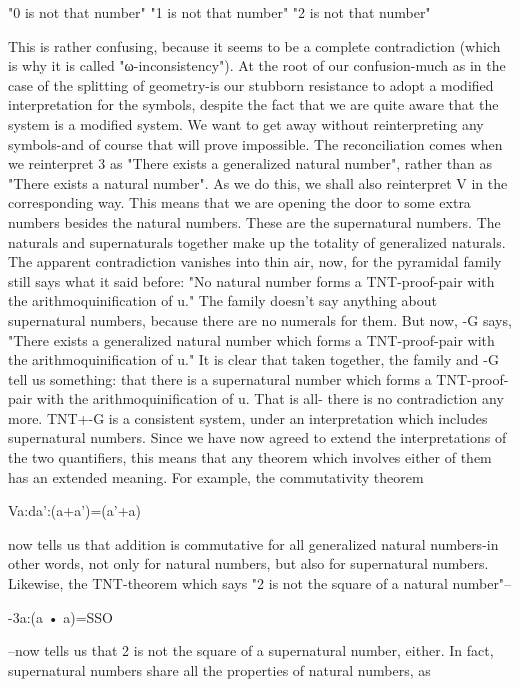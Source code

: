                                  "0 is not that number"
                                  "1 is not that number"
                                  "2 is not that number"

This is rather confusing, because it seems to be a complete contradiction (which is why it
is called "ω-inconsistency"). At the root of our confusion-much as in the case of the
splitting of geometry-is our stubborn resistance to adopt a modified interpretation for the
symbols, despite the fact that we are quite aware that the system is a modified system.
We want to get away without reinterpreting any symbols-and of course that will prove
impossible.
        The reconciliation comes when we reinterpret 3 as "There exists a generalized
natural number", rather than as "There exists a natural number". As we do this, we shall
also reinterpret V in the corresponding way. This means that we are opening the door to
some extra numbers besides the natural numbers. These are the supernatural numbers.
The naturals and supernaturals together make up the totality of generalized naturals.
        The apparent contradiction vanishes into thin air, now, for the pyramidal family
still says what it said before: "No natural number forms a TNT-proof-pair with the
arithmoquinification of u." The family doesn't say anything about supernatural numbers,
because there are no numerals for them. But now, -G says, "There exists a generalized
natural number which forms a TNT-proof-pair with the arithmoquinification of u." It is
clear that taken together, the family and -G tell us something: that there is a supernatural
number which forms a TNT-proof-pair with the arithmoquinification of u. That is all-
there is no contradiction any more. TNT+-G is a consistent system, under an
interpretation which includes supernatural numbers.
        Since we have now agreed to extend the interpretations of the two quantifiers, this
means that any theorem which involves either of them has an extended meaning. For
example, the commutativity theorem

                                  Va:da':(a+a')=(a'+a)

now tells us that addition is commutative for all generalized natural numbers-in other
words, not only for natural numbers, but also for supernatural numbers. Likewise, the
TNT-theorem which says "2 is not the square of a natural number"--

                                     -3a:(a • a)=SSO

--now tells us that 2 is not the square of a supernatural number, either. In fact,
supernatural numbers share all the properties of natural numbers, as




